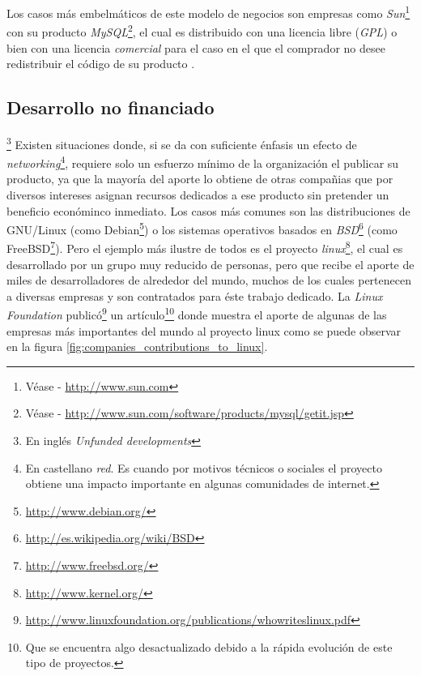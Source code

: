Los casos m\'as embelm\'aticos de este modelo de negocios son empresas como
\emph{Sun}\footnote{V\'ease - \url{http://www.sun.com}} con su producto
\emph{MySQL}\footnote{
V\'ease - \url{http://www.sun.com/software/products/mysql/getit.jsp}}, el cual
es distribuido con una licencia libre (\emph{GPL}) o bien con una licencia
\emph{comercial} para el caso en el que el comprador no desee redistribuir el
c\'odigo de su producto	.

\subsection{Desarrollo no financiado}\footnote{En ingl\'es \emph{Unfunded
developments}}
%
Existen situaciones donde, si se da con suficiente \'enfasis un efecto de
\emph{networking}\footnote{En castellano \emph{red}. Es cuando por motivos
t\'ecnicos o sociales el proyecto obtiene una impacto importante en 
algunas comunidades de internet.}, requiere solo un esfuerzo m\'inimo de la
organizaci\'on el publicar su producto, ya que la mayor\'ia del aporte lo
obtiene de otras compa\~nias que por diversos intereses asignan recursos
dedicados a ese producto sin pretender un beneficio econ\'ominco inmediato.
Los casos m\'as comunes son las distribuciones de GNU/Linux (como
Debian\footnote{\url{http://www.debian.org/}}) o los sistemas operativos
basados en \emph{BSD}\footnote{\url{http://es.wikipedia.org/wiki/BSD}} (como
FreeBSD\footnote{\url{http://www.freebsd.org/}}). Pero el ejemplo m\'as
ilustre de todos es el proyecto
\emph{linux}\footnote{\url{http://www.kernel.org/}}, el cual es desarrollado
por un grupo muy reducido de personas, pero que recibe el aporte de miles de
desarrolladores de alrededor del mundo, muchos de los cuales pertenecen a
diversas empresas y son contratados para \'este trabajo dedicado.
La \emph{Linux Foundation}
public\'o\footnote{\url{
http://www.linuxfoundation.org/publications/whowriteslinux.pdf}} un
art\'iculo\footnote{Que se encuentra algo desactualizado debido a la r\'apida
evoluci\'on de este tipo de proyectos.} donde muestra el aporte de algunas de
las empresas m\'as importantes del mundo al proyecto linux como se puede
observar en la figura \ref{fig:companies_contributions_to_linux}.

